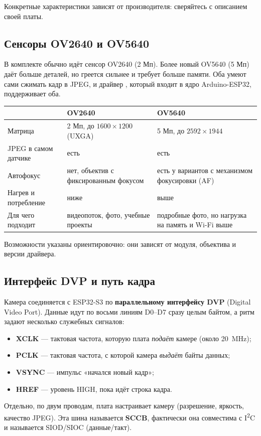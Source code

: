 Конкретные характеристики зависят от производителя: сверяйтесь с описанием своей платы.

\subsection{Сенсоры OV2640 и OV5640}

В комплекте обычно идёт сенсор OV2640 (2 Мп). Более новый OV5640 (5 Мп) даёт больше деталей, но греется
сильнее и требует больше памяти. Оба умеют сами сжимать кадр в JPEG, и драйвер , который
входит в ядро Arduino-ESP32, поддерживает оба.

\begin{center}\small
\begin{tabularx}{\textwidth}{@{}l X X@{}}
\toprule
 & OV2640 & OV5640 \\
\midrule
Матрица & 2 Мп, до $1600\times1200$ (UXGA) & 5 Мп, до $2592\times1944$ \\
JPEG в самом датчике & есть & есть \\
Автофокус & нет, объектив с фиксированным фокусом & есть у вариантов с механизмом фокусировки (AF) \\
Нагрев и потребление & ниже & выше \\
Для чего подходит & видеопоток, фото, учебные проекты & подробные фото, но нагрузка на память и Wi-Fi выше \\
\bottomrule
\end{tabularx}
\end{center}

Возможности указаны ориентировочно: они зависят от модуля, объектива и версии драйвера.

\subsection{Интерфейс DVP и путь кадра}

Камера соединяется с ESP32-S3 по \textbf{параллельному интерфейсу DVP} (Digital Video Port). Данные идут
по восьми линиям D0--D7 сразу целым байтом, а ритм задают несколько служебных сигналов:
\begin{itemize}[leftmargin=*]
  \item \textbf{XCLK} --- тактовая частота, которую плата \emph{подаёт} камере (около \SI{20}{MHz});
  \item \textbf{PCLK} --- тактовая частота, с которой камера \emph{выдаёт} байты данных;
  \item \textbf{VSYNC} --- импульс «начался новый кадр»;
  \item \textbf{HREF} --- уровень HIGH, пока идёт строка кадра.
\end{itemize}
Отдельно, по двум проводам, плата настраивает камеру (разрешение, яркость, качество JPEG). Эта шина
называется \textbf{SCCB}, фактически она совместима с I\textsuperscript{2}C и называется SIOD/SIOC (данные/такт).

